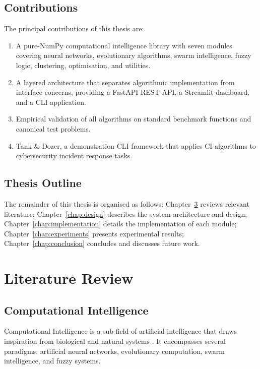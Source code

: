 \documentclass[12pt,a4paper,twoside]{report}
\begin{document}
\section{Contributions}
The principal contributions of this thesis are:
\begin{enumerate}
  \item A pure-NumPy computational intelligence library with seven modules
        covering neural networks, evolutionary algorithms, swarm intelligence,
        fuzzy logic, clustering, optimisation, and utilities.
  \item A layered architecture that separates algorithmic implementation
        from interface concerns, providing a FastAPI REST API, a Streamlit
        dashboard, and a CLI application.
  \item Empirical validation of all algorithms on standard benchmark functions
        and canonical test problems.
  \item Tank \& Dozer, a demonstration CLI framework that applies CI algorithms
        to cybersecurity incident response tasks.
\end{enumerate}

\section{Thesis Outline}
The remainder of this thesis is organised as follows:
Chapter~\ref{chap:background} reviews relevant literature;
Chapter~\ref{chap:design} describes the system architecture and design;
Chapter~\ref{chap:implementation} details the implementation of each module;
Chapter~\ref{chap:experiments} presents experimental results;
Chapter~\ref{chap:conclusion} concludes and discusses future work.


\chapter{Literature Review}
\label{chap:background}

\section{Computational Intelligence}
Computational Intelligence is a sub-field of artificial intelligence that
draws inspiration from biological and natural systems
\citep{engelbrecht2007computational}. It encompasses several paradigms:
artificial neural networks, evolutionary computation, swarm intelligence,
and fuzzy systems.
\end{document}
